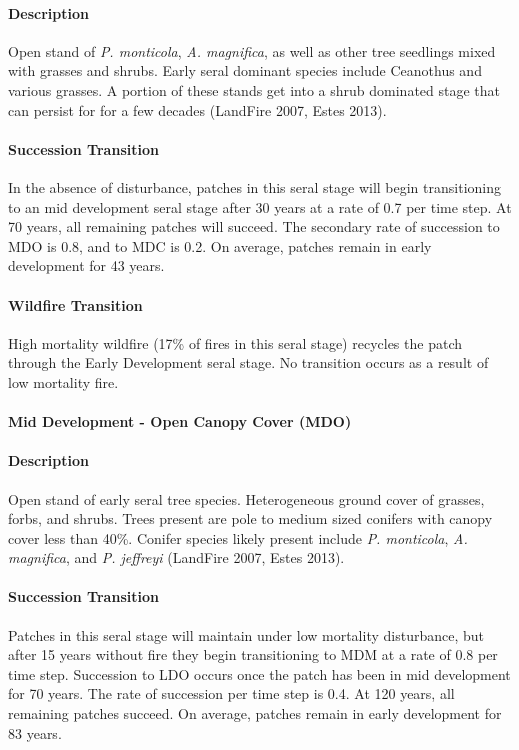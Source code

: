 \paragraph*{Description} Open stand of \emph{P. monticola}, \emph{A. magnifica}, as well as other tree seedlings mixed with grasses and shrubs. Early seral dominant species include Ceanothus and various grasses. A portion of these stands get into a shrub dominated stage that can persist for for a few decades (LandFire 2007, Estes 2013).

\paragraph*{Succession Transition} In the absence of disturbance, patches in this seral stage will begin transitioning to an mid development seral stage after 30 years at a rate of 0.7 per time step. At 70 years, all remaining patches will succeed. The secondary rate of succession to MDO is 0.8, and to MDC is 0.2. On average, patches remain in early development for 43 years.

\paragraph*{Wildfire Transition} High mortality wildfire (17\% of fires in this seral stage) recycles the patch through the Early Development seral stage. No transition occurs as a result of low mortality fire.

\noindent\hrulefill


\paragraph*{Mid Development - Open Canopy Cover (MDO)}

\paragraph*{Description} Open stand of early seral tree species. Heterogeneous ground cover of grasses, forbs, and shrubs. Trees present are pole to medium sized conifers with canopy cover less than 40\%. Conifer species likely present include \emph{P. monticola}, \emph{A. magnifica}, and \emph{P. jeffreyi} (LandFire 2007, Estes 2013).

\paragraph*{Succession Transition} Patches in this seral stage will maintain under low mortality disturbance, but after 15 years without fire they begin transitioning to MDM at a rate of 0.8 per time step. Succession to LDO occurs once the patch has been in mid development for 70 years. The rate of succession per time step is 0.4. At 120 years, all remaining patches succeed. On average, patches remain in early development for 83 years.

